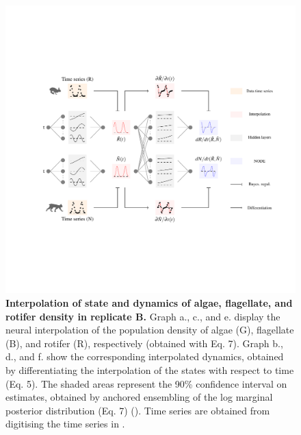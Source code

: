\documentclass[11pt, oneside]{article}
\begin{document}
\begin{figure}[H]
\includegraphics[width=1\linewidth,page=20]{figures/main.pdf}
\caption{
    \textbf{Interpolation of state and dynamics of algae, flagellate, and rotifer density in replicate B.}
    Graph a., c., and e. display the neural interpolation of the population density of algae (G), flagellate (B), and rotifer (R), respectively (obtained with Eq. 7). 
    Graph b., d., and f. show the corresponding interpolated dynamics, obtained by differentiating the interpolation of the states with respect to time (Eq. 5).
    The shaded areas represent the 90\% confidence interval on estimates, obtained by anchored ensembling of the log marginal posterior distribution (Eq. 7) (\cite{Pearce2018}).
    Time series are obtained from digitising the time series in \cite{Hiltunen2013}.
}
\end{figure}
\newpage
\end{document}
